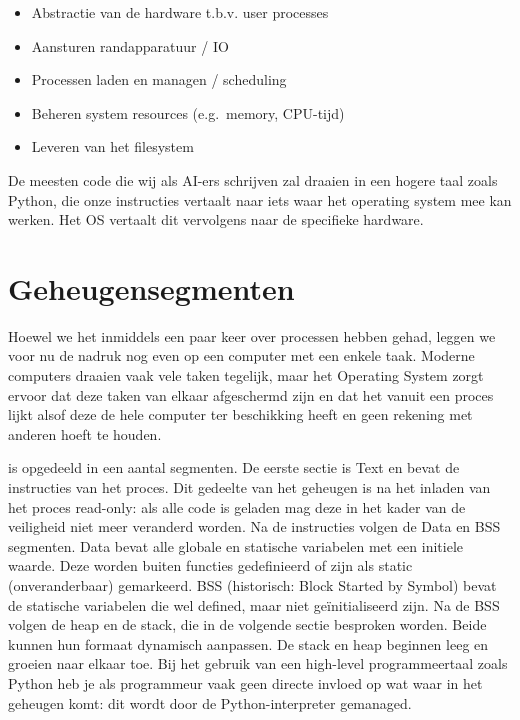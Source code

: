\begin{itemize}
\item Abstractie van de hardware t.b.v. user processes
\item Aansturen randapparatuur / IO
\item Processen laden en managen / scheduling
\item Beheren system resources (e.g.~memory, CPU-tijd)
\item Leveren van het filesystem
\end{itemize}

De meesten code die wij als AI-ers schrijven zal draaien in een hogere taal zoals Python, die onze instructies vertaalt naar iets waar het operating system mee kan werken. Het OS vertaalt dit vervolgens naar de specifieke hardware.


\section{Geheugensegmenten}\label{geheugensegmenten}

Hoewel we het inmiddels een paar keer over processen hebben gehad,
leggen we voor nu de nadruk nog even op een computer met een enkele
taak. Moderne computers draaien vaak vele taken tegelijk, maar het Operating System zorgt ervoor dat deze taken van elkaar afgeschermd zijn en dat het vanuit een proces lijkt alsof deze de hele computer ter beschikking heeft en geen rekening met anderen hoeft te houden.

 is opgedeeld in een aantal segmenten. De eerste sectie is Text en bevat de instructies van het proces. Dit gedeelte van het geheugen is na het inladen van het proces read-only: als alle code is geladen mag deze in het kader van de veiligheid niet meer veranderd worden. Na de instructies volgen de Data en BSS segmenten. Data bevat alle globale en statische variabelen met een initiele waarde. Deze worden buiten functies gedefinieerd of zijn als static (onveranderbaar) gemarkeerd. BSS (historisch: Block Started by Symbol) bevat de statische variabelen die wel defined, maar niet geïnitialiseerd zijn. Na de BSS volgen de heap en de stack, die in de volgende sectie besproken worden. Beide kunnen hun formaat dynamisch aanpassen. De stack en heap beginnen leeg en groeien naar elkaar toe. Bij het gebruik van een high-level programmeertaal zoals Python heb je als programmeur vaak geen directe invloed op wat waar in het geheugen komt: dit wordt door de Python-interpreter gemanaged.

